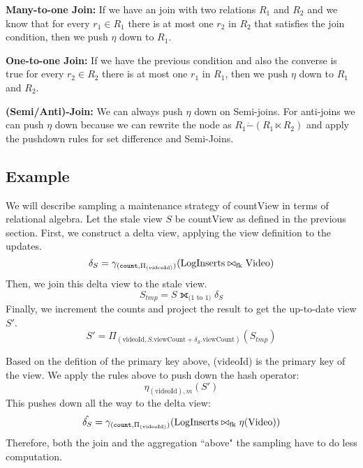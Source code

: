 \textbf{Many-to-one Join: } If we have an join with two relations $R_1$ and $R_2$ and we know that for every $r_1 \in R_1$ there is at most one $r_2$ in $R_2$ that satisfies the join condition, then we push $\eta$ down to $R_1$.

\textbf{One-to-one Join: } If we have the previous condition and also the converse is true for every $r_2 \in R_2$ there is at most one $r_1$ in $R_1$, then we push $\eta$ down to $R_1$ and $R_2$.

\textbf{(Semi/Anti)-Join: } We can always push $\eta$ down on Semi-joins. For anti-joins we can push $\eta$ down because we can rewrite the node as $R_1 \dot{-} (R_1 \ltimes R_2) $ and apply the pushdown rules for set difference and Semi-Joins.

\subsection{Example}
We will describe sampling a maintenance strategy of \textsf{countView} in terms of relational algebra.
Let the stale view $S$ be \textsf{countView} as defined in the previous section.
First, we construct a delta view, applying the view definition to the updates.
\[
\delta_{S} = \gamma_{(\texttt{count},\Pi_{(\text{videoId})})}(\text{LogInserts} \bowtie_{\text{fk}} \text{Video})
\]
Then, we join this delta view to the stale view.
\[
  S_{tmp} = S \fullouterjoin_{\text{(1 to 1)}} \delta_{S}
\]
Finally, we increment the counts and project the result to get the up-to-date view $S'$.
\[
S' = \Pi_{(\text{videoId},S.\text{viewCount} + \delta_{S}.\text{viewCount})}(S_{tmp})
\]

Based on the defition of the primary key above, (videoId) is the primary key of the view.
We apply the rules above to push down the hash operator:
\[
\eta_{(\text{videoId}), m}(S')
\]
This pushes down all the way to the delta view:
\[
\hat{\delta_{S}} = \gamma_{(\texttt{count},\Pi_{(\text{videoId})})}(\text{LogInserts} \bowtie_{\text{fk}} \eta(\text{Video}))
\]
Therefore, both the join and the aggregation ``above" the sampling have to do less computation.
